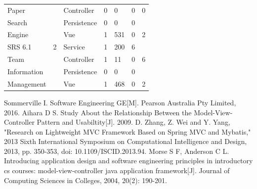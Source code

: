\documentclass[conference]{IEEEtran}
\begin{document}
\begin{table}[!htb]
\begin{tabular}{p{2cm}p{1.5cm}p{2cm}p{3cm}p{1.5cm}p{3cm}l}
		Paper       &              & Controller                  & 0                & 0   & 0                & 0               \\
		Search      &              & Persistence                 & 0                & 0   & 0                &                 \\
		Engine      &              & Vue                         & 1                & 531 & 0                & 2               \\
		\hline
		SRS 6.1     & 2            & Service                     & 1                & 200 & 6                &                 \\
		Team        &              & Controller                  & 1                & 11  & 0                & 6               \\
		Information &              & Persistence                 & 0                & 0   & 0                &                 \\
		Management  &              & Vue                         & 1                & 468 & 0                & 2               \\
		\hline
	\end{tabular}
	\label{tb:cc}
\end{table}





\begin{thebibliography}{00}
	 Sommerville I. Software Engineering GE[M]. Pearson Australia Pty Limited, 2016.
	 Aihara D S. Study About the Relationship Between the Model-View-Controller Pattern and Usabiltity[J]. 2009.
	 D. Zhang, Z. Wei and Y. Yang, "Research on Lightweight MVC Framework Based on Spring MVC and Mybatis," 2013 Sixth International Symposium on Computational Intelligence and Design, 2013, pp. 350-353, doi: 10.1109/ISCID.2013.94.
	 Morse S F, Anderson C L. Introducing application design and software engineering principles in introductory cs courses: model-view-controller java application framework[J]. Journal of Computing Sciences in Colleges, 2004, 20(2): 190-201.

\end{thebibliography}
\end{document}
